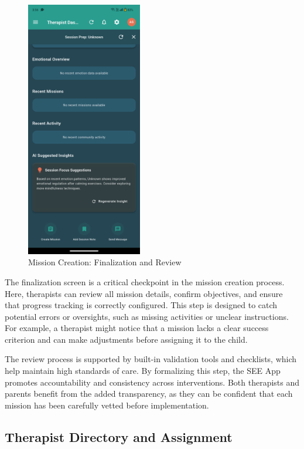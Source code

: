 \documentclass[12pt,a4paper]{article}
\newcommand{\sectiontitle}[1]{\subsection{#1}}
\begin{document}
\begin{figure}[H]
    \centering
    \includegraphics[width=0.45\textwidth]{Screenshots/restofmissioncreationtherapist.png}
    \caption{Mission Creation: Finalization and Review}
    \label{fig:rest-mission-creation-therapist}
\end{figure}
The finalization screen is a critical checkpoint in the mission creation process. Here, therapists can review all mission details, confirm objectives, and ensure that progress tracking is correctly configured. This step is designed to catch potential errors or oversights, such as missing activities or unclear instructions. For example, a therapist might notice that a mission lacks a clear success criterion and can make adjustments before assigning it to the child.

The review process is supported by built-in validation tools and checklists, which help maintain high standards of care. By formalizing this step, the SEE App promotes accountability and consistency across interventions. Both therapists and parents benefit from the added transparency, as they can be confident that each mission has been carefully vetted before implementation.

\sectiontitle{Therapist Directory and Assignment}
\end{document}
